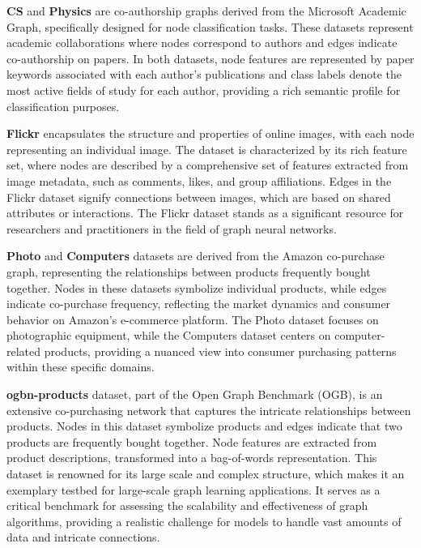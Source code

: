 \textbf{CS} and \textbf{Physics} \cite{shchur2018amazon_datasets} are co-authorship graphs derived from the Microsoft Academic Graph, specifically designed for node classification tasks. These datasets represent academic collaborations where nodes correspond to authors and edges indicate co-authorship on papers. In both datasets, node features are represented by paper keywords associated with each author's publications and class labels denote the most active fields of study for each author, providing a rich semantic profile for classification purposes.

\textbf{Flickr} \cite{zeng2019graphsaint} encapsulates the structure and properties of online images, with each node representing an individual image. The dataset is characterized by its rich feature set, where nodes are described by a comprehensive set of features extracted from image metadata, such as comments, likes, and group affiliations. Edges in the Flickr dataset signify connections between images, which are based on shared attributes or interactions. The Flickr dataset stands as a significant resource for researchers and practitioners in the field of graph neural networks.

\textbf{Photo} and \textbf{Computers} \cite{shchur2018amazon_datasets} datasets are derived from the Amazon co-purchase graph, representing the relationships between products frequently bought together. Nodes in these datasets symbolize individual products, while edges indicate co-purchase frequency, reflecting the market dynamics and consumer behavior on Amazon's e-commerce platform. The Photo dataset focuses on photographic equipment, while the Computers dataset centers on computer-related products, providing a nuanced view into consumer purchasing patterns within these specific domains.

\textbf{ogbn-products} \cite{hu2020ogb} dataset, part of the Open Graph Benchmark (OGB), is an extensive co-purchasing network that captures the intricate relationships between products. Nodes in this dataset symbolize products and edges indicate that two products are frequently bought together. Node features are extracted from product descriptions, transformed into a bag-of-words representation. This dataset is renowned for its large scale and complex structure, which makes it an exemplary testbed for large-scale graph learning applications. It serves as a critical benchmark for assessing the scalability and effectiveness of graph algorithms, providing a realistic challenge for models to handle vast amounts of data and intricate connections.

